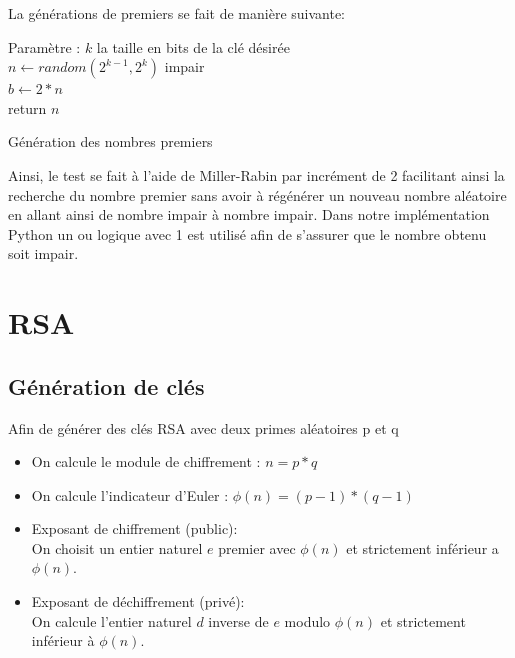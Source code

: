 \documentclass[a4paper, 12pt]{article}
\begin{document}
La générations de premiers se fait de manière suivante:

\begin{algorithm}[H]
\SetAlgoLined
Paramètre : $k$ la taille en bits de la clé désirée \\
    $n \xleftarrow{} random(2^{k-1}, 2^k)$ impair \\
    $b \xleftarrow{} 2 * n$ \\
    return $n$ \;
\caption{Génération des nombres premiers}
\end{algorithm}

Ainsi, le test se fait à l'aide de Miller-Rabin par incrément de 2 facilitant ainsi la recherche du nombre premier sans avoir à régénérer un nouveau nombre aléatoire en allant ainsi de nombre impair à nombre impair.
Dans notre implémentation Python un ou logique avec 1 est utilisé afin de s'assurer que le nombre obtenu soit impair.


\newpage
\section{RSA}

\subsection{Génération de clés}

Afin de générer des clés RSA avec deux primes aléatoires p et q
\begin{itemize}[label=\textbullet,font=\large]
    \item On calcule le module de chiffrement : $n = p * q$
    \item On calcule l'indicateur d'Euler : $\phi(n) = (p - 1)  * (q - 1)$
    \item Exposant de chiffrement (public): \\
        On choisit un entier naturel $e$ premier avec $\phi(n)$ et strictement inférieur a $\phi(n)$.
    \item Exposant de déchiffrement (privé): \\
        On calcule l'entier naturel $d$ inverse de $e$ modulo $\phi(n)$ et strictement inférieur à $\phi(n)$.
\end{itemize}
\bigskip
\end{document}

